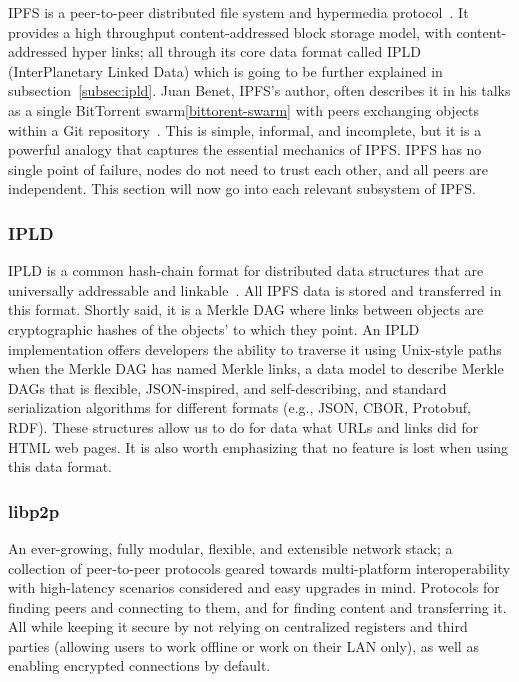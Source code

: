 IPFS is a peer-to-peer distributed file system and hypermedia protocol~\cite{IPFS}.
It provides a high throughput content-addressed block storage model, with content-addressed hyper links; all through its core data format called IPLD (InterPlanetary Linked Data) which is going to be further explained in subsection~\ref{subsec:ipld}.
Juan Benet, IPFS's author, often describes it in his talks as a single BitTorrent swarm\ref{bittorent-swarm} with peers exchanging objects within a Git repository~\cite{github:ipfspaper}.
This is simple, informal, and incomplete, but it is a powerful analogy that captures the essential mechanics of IPFS.
IPFS has no single point of failure, nodes do not need to trust each other, and all peers are independent.
This section will now go into each relevant subsystem of IPFS.

\subsubsection{\label{subsec:ipld}IPLD}

IPLD is a common hash-chain format for distributed data structures that are universally addressable and linkable~\cite{github:ipld}.
All IPFS data is stored and transferred in this format.
Shortly said, it is a Merkle DAG where links between objects are cryptographic hashes of the objects' to which they point.
An IPLD implementation offers developers the ability to traverse it using Unix-style paths when the Merkle DAG has named Merkle links, a data model to describe Merkle DAGs that is flexible, JSON-inspired, and self-describing, and standard serialization algorithms for different formats (e.g., JSON, CBOR, Protobuf, RDF).
These structures allow us to do for data what URLs and links did for HTML web pages.
It is also worth emphasizing that no feature is lost when using this data format.

\subsubsection{\label{subsec:libp2p}libp2p}

An ever-growing, fully modular, flexible, and extensible network stack; a collection of peer-to-peer protocols geared towards multi-platform interoperability with high-latency scenarios considered and easy upgrades in mind.
Protocols for finding peers and connecting to them, and for finding content and transferring it.
All while keeping it secure by not relying on centralized registers and third parties (allowing users to work offline or work on their LAN only), as well as enabling encrypted connections by default.

